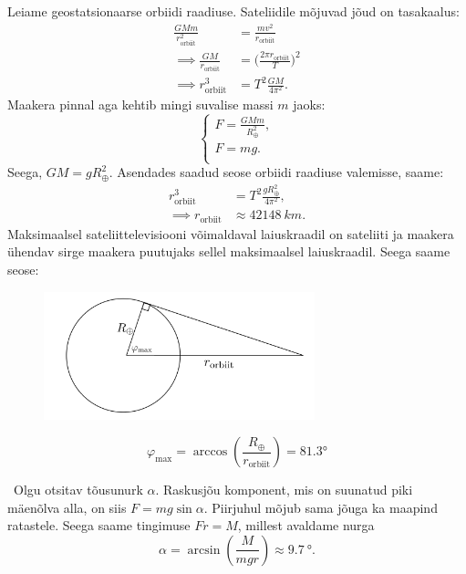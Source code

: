 \documentclass[10pt]{article}
\begin{document}
\solu
Leiame geostatsionaarse orbiidi raadiuse. Sateliidile mõjuvad jõud on tasakaalus:
\begin{align*}
\frac{GMm}{r_\text{orbiit}^2}&=\frac{mv^2}{r_\text{orbiit}}\\
\implies \frac{GM}{r_\text{orbiit}}&= \bigg( \frac{2\pi r_\text{orbiit}}{T} \bigg)^2\\
\implies r_\text{orbiit}^3 &= T^2 \frac{GM}{4 \pi^2}.
\end{align*}
Maakera pinnal aga kehtib mingi suvalise massi $m$ jaoks:
\begin{equation*}
  \begin{cases}
    F = \frac{GMm}{R_\oplus^2}, \\
    F = mg. \\
  \end{cases}
\end{equation*}
Seega, $GM = g R_\oplus^2$. Asendades saadud seose orbiidi raadiuse valemisse, saame:
\begin{align*}
r_\mathrm{orbiit}^3 &= T^2 \frac{g R_\oplus^2}{4 \pi^2},\\
\implies r_\mathrm{orbiit} &\approx \SI{42148}{km}.
\end{align*}
Maksimaalsel sateliittelevisiooni võimaldaval laiuskraadil on sateliiti ja maakera ühendav sirge maakera puutujaks sellel maksimaalsel laiuskraadil. Seega saame seose:
\begin{figure}[h]
  \centering
  \includegraphics[width = 0.7\textwidth]{2022-v2g-05-yl.png}
\end{figure}
\begin{equation*}
\varphi_\mathrm{max} = \arccos{\left( \frac{R_\oplus}{r_\text{orbiit}}\right)} = \ang{81.3}
\end{equation*}
\probend
\bigskip


\solu
\
\osa Olgu otsitav tõusunurk $\alpha$. Raskusjõu komponent, mis on suunatud piki mäenõlva alla, on siis $F=mg\sin\alpha$. Piirjuhul mõjub sama jõuga ka maapind ratastele. Seega saame tingimuse $Fr=M$, millest avaldame nurga
\[
\alpha=\arcsin\left( \frac{M}{mgr}\right)\approx \SI{9.7}{\degree}.
\]
\end{document}
